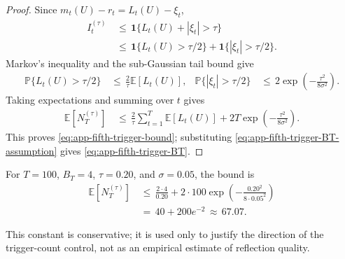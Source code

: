 \documentclass{article} %
\begin{document}
\begin{proof}
Since \(m_t(U)-r_t=L_t(U)-\xi_t\),
\begin{equation}
\label{eq:app-fifth-trigger-proof-indicator}
\begin{aligned}
I_t^{(\tau)}
&\,\le\,
\mathbf{1}\{L_t(U)+|\xi_t|>\tau\}
\\
&\,\le\,
\mathbf{1}\{L_t(U)>\tau/2\}
+
\mathbf{1}\{|\xi_t|>\tau/2\}.
\end{aligned}
\end{equation}
Markov's inequality and the sub-Gaussian tail bound give
\begin{equation}
\begin{aligned}
\mathbb{P}\{L_t(U)>\tau/2\}
&\,\leq\,\frac{2}{\tau}\mathbb E[L_t(U)], &
\mathbb{P}\{|\xi_t|>\tau/2\}
&\,\leq\,2\exp\!\left(-\frac{\tau^2}{8\sigma^2}\right).
\end{aligned}
\end{equation}
Taking expectations and summing over \(t\) gives
\begin{equation}
\label{eq:app-fifth-trigger-proof-sum}
\begin{aligned}
\mathbb{E}[N_T^{(\tau)}]
&\,\le\,
\frac{2}{\tau}
\sum_{t=1}^{T}\mathbb{E}[L_t(U)]
+
2T\exp\!\left(
-\frac{\tau^2}{8\sigma^2}
\right).
\end{aligned}
\end{equation}
This proves \eqref{eq:app-fifth-trigger-bound}; substituting
\eqref{eq:app-fifth-trigger-BT-assumption} gives
\eqref{eq:app-fifth-trigger-BT}.
\end{proof}

For \(T=100\), \(B_T=4\), \(\tau=0.20\), and \(\sigma=0.05\), the bound is
\begin{equation}
\label{eq:app-fifth-trigger-example}
\begin{aligned}
\mathbb{E}[N_T^{(\tau)}]
&\,\le\,
\frac{2\cdot 4}{0.20}
+
2\cdot 100\exp\!\left(
-\frac{0.20^2}{8\cdot 0.05^2}
\right)
\\
&\,=\,
40+200e^{-2}
\,\approx\,67.07.
\end{aligned}
\end{equation}

This constant is conservative; it is used only to justify the direction of the trigger-count control, not as an empirical estimate of reflection quality.
\end{document}
